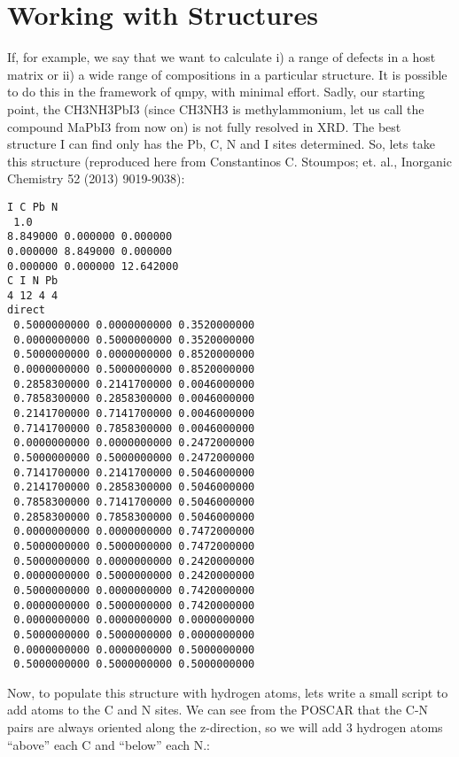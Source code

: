 \documentclass[letterpaper,10pt,english]{sphinxmanual}
\begin{document}
\section{Working with Structures}
\label{project:working-with-structures}
If, for example, we say that we want to calculate i) a range of defects in a
host matrix or ii) a wide range of compositions in a particular structure. It
is possible to do this in the framework of qmpy, with minimal effort. Sadly,
our starting point, the CH3NH3PbI3 (since CH3NH3 is methylammonium, let us call
the compound MaPbI3 from now on) is not fully resolved in XRD. The best
structure I can find only has the Pb, C, N and I sites determined. So, lets
take this structure (reproduced here from Constantinos C. Stoumpos; et. al.,
Inorganic Chemistry 52 (2013) 9019-9038):

\begin{Verbatim}[commandchars=\\\{\}]
I C Pb N
 1.0
8.849000 0.000000 0.000000
0.000000 8.849000 0.000000
0.000000 0.000000 12.642000
C I N Pb
4 12 4 4
direct
 0.5000000000 0.0000000000 0.3520000000
 0.0000000000 0.5000000000 0.3520000000
 0.5000000000 0.0000000000 0.8520000000
 0.0000000000 0.5000000000 0.8520000000
 0.2858300000 0.2141700000 0.0046000000
 0.7858300000 0.2858300000 0.0046000000
 0.2141700000 0.7141700000 0.0046000000
 0.7141700000 0.7858300000 0.0046000000
 0.0000000000 0.0000000000 0.2472000000
 0.5000000000 0.5000000000 0.2472000000
 0.7141700000 0.2141700000 0.5046000000
 0.2141700000 0.2858300000 0.5046000000
 0.7858300000 0.7141700000 0.5046000000
 0.2858300000 0.7858300000 0.5046000000
 0.0000000000 0.0000000000 0.7472000000
 0.5000000000 0.5000000000 0.7472000000
 0.5000000000 0.0000000000 0.2420000000
 0.0000000000 0.5000000000 0.2420000000
 0.5000000000 0.0000000000 0.7420000000
 0.0000000000 0.5000000000 0.7420000000
 0.0000000000 0.0000000000 0.0000000000
 0.5000000000 0.5000000000 0.0000000000
 0.0000000000 0.0000000000 0.5000000000
 0.5000000000 0.5000000000 0.5000000000
\end{Verbatim}

Now, to populate this structure with hydrogen atoms, lets write a small script
to add atoms to the C and N sites. We can see from the POSCAR that the C-N
pairs are always oriented along the z-direction, so we will add 3 hydrogen
atoms ``above'' each C and ``below'' each N.:
\end{document}

